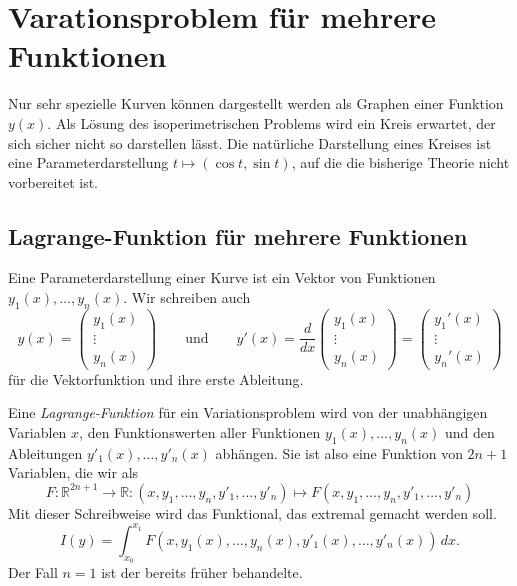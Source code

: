 %
%
%
\section{Varationsproblem für mehrere Funktionen
\label{buch:variation:section:mehrerefunktionen}}
Nur sehr spezielle Kurven können dargestellt werden als Graphen
einer Funktion $y(x)$.
Als Lösung des isoperimetrischen Problems wird ein Kreis erwartet,
der sich sicher nicht so darstellen lässt.
Die natürliche Darstellung eines Kreises ist eine Parameterdarstellung
$t\mapsto(\cos t,\sin t)$, auf die die bisherige Theorie nicht
vorbereitet ist.

%
%
\subsection{Lagrange-Funktion für mehrere Funktionen
\label{buch:variation:mehrerefunction:subsection:lagrangefunktion}}
Eine Parameterdarstellung einer Kurve ist ein Vektor von Funktionen
$y_1(x),\dots,y_n(x)$.
Wir schreiben auch
\[
y(x)
=
\begin{pmatrix}
y_1(x)\\
\vdots\\
y_n(x)
\end{pmatrix}
\qquad\text{und}\qquad
y'(x)
=
\frac{d}{dx}
\begin{pmatrix}
y_1(x)\\
\vdots\\
y_n(x)
\end{pmatrix}
=
\begin{pmatrix}
y_1'(x)\\
\vdots\\
y_n'(x)
\end{pmatrix}
\]
für die Vektorfunktion und ihre erste Ableitung.

Eine {\em Lagrange-Funktion} für ein Variationsproblem wird von
der unabhängigen Variablen $x$, den Funktionswerten aller Funktionen
$y_1(x),\dots,y_n(x)$ und den Ableitungen $y'_1(x),\dots,y'_n(x)$
abhängen.
Sie ist also eine Funktion von $2n+1$ Variablen, die wir als
\begin{equation*}
F
\colon
\mathbb{R}^{2n+1}\to\mathbb{R}
:
(x,y_1,\dots,y_n,y'_1,\dots,y'_n)\mapsto F(x,y_1,\dots,y_n,y'_1,\dots,y'_n)
\end{equation*}
Mit dieser Schreibweise wird das Funktional, das extremal gemacht 
werden soll.
\[
I(y)
=
\int_{x_0}^{x_1}
F(x,y_1(x),\dots,y_n(x),y'_1(x),\dots,y'_n(x))\,dx.
\]
Der Fall $n=1$ ist der bereits früher behandelte.

